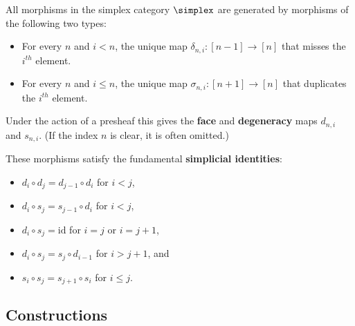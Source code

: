     \begin{property}
        All morphisms in the simplex category $\simplex$ are generated by morphisms of the following two types:
        \begin{itemize}
            \item For every $n$ and $i<n$, the unique map $\delta_{n,i}:[n-1]\rightarrow[n]$ that misses the $i^{th}$ element.
            \item For every $n$ and $i\leq n$, the unique map $\sigma_{n,i}:[n+1]\rightarrow[n]$ that duplicates the $i^{th}$ element.
        \end{itemize}
        Under the action of a presheaf this gives the \textbf{face} and \textbf{degeneracy} maps $d_{n,i}$ and $s_{n,i}$. (If the index $n$ is clear, it is often omitted.)

        These morphisms satisfy the fundamental \textbf{simplicial identities}:
        \begin{itemize}
            \item $d_i\circ d_j = d_{j-1}\circ d_i$ for $i<j$,
            \item $d_i\circ s_j = s_{j-1}\circ d_i$ for $i<j$,
            \item $d_i\circ s_j = \text{id}$ for $i=j$ or $i=j+1$,
            \item $d_i\circ s_j = s_j\circ d_{i-1}$ for $i>j+1$, and
            \item $s_i\circ s_j = s_{j+1}\circ s_i$ for $i\leq j$.
        \end{itemize}
    \end{property}


\subsection{Constructions}

